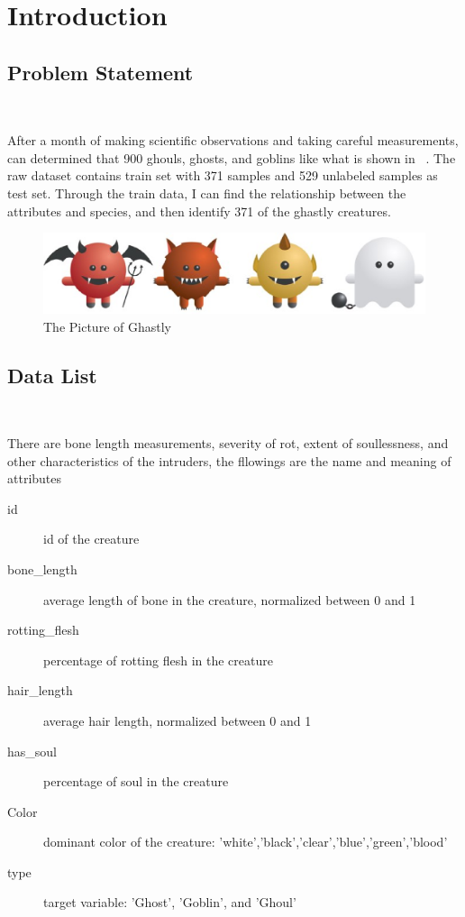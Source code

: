 
\section{Introduction}\label{sec-intro}

\subsection{Problem Statement}
\

After a month of making scientific observations 
and taking careful measurements, 
can determined that 900 ghouls, ghosts, and goblins
like what is shown in~  .
The raw dataset contains train set with 371 %
samples and 529 unlabeled samples as test set.
Through the train data, I can find the relationship
between the attributes and species, 
and then identify 371 of the ghastly creatures.


\begin{figure}[htbp]
	\centering
	\includegraphics[scale=0.3]{figures/bar.eps}
	\caption{The Picture of Ghastly}\label{fig:animal}
\end{figure}


\subsection{Data List}
\

There are bone length measurements, 
severity of rot, extent of soullessness, 
and other characteristics of the intruders,
the fllowings are the  
name and meaning of attributes


\begin{description}
	\item[id] id of the creature
	\item[bone_length] average length of bone in the creature, normalized between 0 and 1
	\item[rotting_flesh] percentage of rotting flesh in the creature
	\item[hair_length] average hair length, normalized between 0 and 1
	\item[has_soul] percentage of soul in the creature
	\item[Color] dominant color of the creature: 'white','black','clear','blue','green','blood'
	\item[type] target variable: 'Ghost', 'Goblin', and 'Ghoul'
\end{description}


